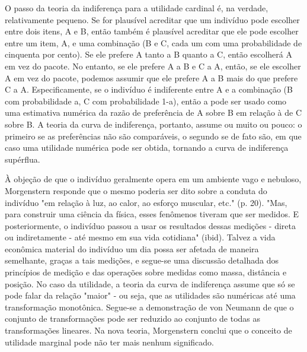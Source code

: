 \documentclass[12pt]{article}
\begin{document}
O passo da teoria da indiferença para a utilidade cardinal é, na verdade, relativamente pequeno. Se for plausível acreditar que um indivíduo pode escolher entre dois itens, A e B, então também é plausível acreditar que ele pode escolher entre um item, A, e uma combinação (B e C, cada um com uma probabilidade de cinquenta por cento). Se ele prefere A tanto a B quanto a C, então escolherá A em vez do pacote. No entanto, se ele prefere A a B e C a A, então, se ele escolher A em vez do pacote, podemos assumir que ele prefere A a B mais do que prefere C a A. Especificamente, se o indivíduo é indiferente entre A e a combinação (B com probabilidade a, C com probabilidade 1-a), então a pode ser usado como uma estimativa numérica da razão de preferência de A sobre B em relação à de C sobre B. A teoria da curva de indiferença, portanto, assume ou muito ou pouco: o primeiro se as preferências não são comparáveis, o segundo se de fato são, em que caso uma utilidade numérica pode ser obtida, tornando a curva de indiferença supérflua.

À objeção de que o indivíduo geralmente opera em um ambiente vago e nebuloso, Morgenstern responde que o mesmo poderia ser dito sobre a conduta do indivíduo "em relação à luz, ao calor, ao esforço muscular, etc." (p. 20). "Mas, para construir uma ciência da física, esses fenômenos tiveram que ser medidos. E posteriormente, o indivíduo passou a usar os resultados dessas medições - direta ou indiretamente - até mesmo em sua vida cotidiana" (ibid). Talvez a vida econômica material do indivíduo um dia possa ser afetada de maneira semelhante, graças a tais medições, e segue-se uma discussão detalhada dos princípios de medição e das operações sobre medidas como massa, distância e posição. No caso da utilidade, a teoria da curva de indiferença assume que só se pode falar da relação "maior" - ou seja, que as utilidades são numéricas até uma transformação monotônica. Segue-se a demonstração de von Neumann de que o conjunto de transformações pode ser reduzido ao conjunto de todas as transformações lineares. Na nova teoria, Morgenstern conclui que o conceito de utilidade marginal pode não ter mais nenhum significado.
\end{document}
